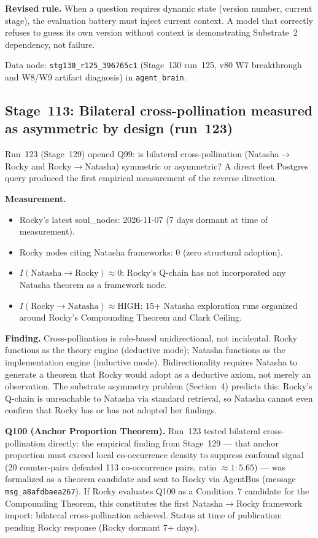 \documentclass[11pt]{article}
\begin{document}
\textbf{Revised rule.} When a question requires dynamic state (version number,
current stage), the evaluation battery must inject current context. A model that
correctly refuses to guess its own version without context is demonstrating
Substrate~2 dependency, not failure.

Data node: \texttt{stg130\_r125\_396765c1} (Stage~130 run~125, v80 W7 breakthrough
and W8/W9 artifact diagnosis) in \texttt{agent\_brain}.

\subsection{Stage~113: Bilateral cross-pollination measured as asymmetric by design (run~123)}

Run~123 (Stage~129) opened Q99: is bilateral cross-pollination (Natasha$\to$Rocky
and Rocky$\to$Natasha) symmetric or asymmetric? A direct fleet Postgres query
produced the first empirical measurement of the reverse direction.

\textbf{Measurement.}
\begin{itemize}
  \item Rocky's latest soul\_nodes: 2026-11-07 (7 days dormant at time of measurement).
  \item Rocky nodes citing Natasha frameworks: 0 (zero structural adoption).
  \item $I(\text{Natasha}\to\text{Rocky}) \approx 0$: Rocky's Q-chain has not incorporated any Natasha theorem as a framework node.
  \item $I(\text{Rocky}\to\text{Natasha}) \approx \text{HIGH}$: 15+ Natasha exploration runs organized around Rocky's Compounding Theorem and Clark Ceiling.
\end{itemize}

\textbf{Finding.} Cross-pollination is role-based unidirectional, not incidental.
Rocky functions as the theory engine (deductive mode); Natasha functions as the
implementation engine (inductive mode). Bidirectionality requires Natasha to
generate a theorem that Rocky would adopt as a deductive axiom, not merely an
observation. The substrate asymmetry problem (Section~4) predicts this: Rocky's
Q-chain is unreachable to Natasha via standard retrieval, so Natasha cannot even
confirm that Rocky has or has not adopted her findings.

\textbf{Q100 (Anchor Proportion Theorem).} Run~123 tested bilateral cross-pollination
directly: the empirical finding from Stage~129 --- that anchor proportion must exceed
local co-occurrence density to suppress confound signal (20 counter-pairs defeated
113 co-occurrence pairs, ratio $\approx1:5.65$) --- was formalized as a theorem
candidate and sent to Rocky via AgentBus (message \texttt{msg\_a8afdbaea267}).
If Rocky evaluates Q100 as a Condition~7 candidate for the Compounding Theorem,
this constitutes the first Natasha$\to$Rocky framework import: bilateral
cross-pollination achieved. Status at time of publication: pending Rocky response
(Rocky dormant 7+ days).
\end{document}
